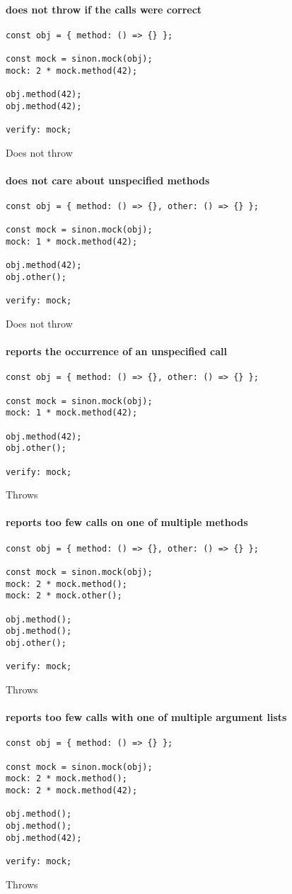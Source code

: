 \paragraph*{does not throw if the calls were correct}
\begin{verbatim}
const obj = { method: () => {} };

const mock = sinon.mock(obj);
mock: 2 * mock.method(42);

obj.method(42);
obj.method(42);

verify: mock;
\end{verbatim}
Does not throw
\paragraph*{does not care about unspecified methods}
\begin{verbatim}
const obj = { method: () => {}, other: () => {} };

const mock = sinon.mock(obj);
mock: 1 * mock.method(42);

obj.method(42);
obj.other();

verify: mock;
\end{verbatim}
Does not throw
\paragraph*{reports the occurrence of an unspecified call}
\begin{verbatim}
const obj = { method: () => {}, other: () => {} };

const mock = sinon.mock(obj);
mock: 1 * mock.method(42);

obj.method(42);
obj.other();

verify: mock;
\end{verbatim}
Throws
\paragraph*{reports too few calls on one of multiple methods}
\begin{verbatim}
const obj = { method: () => {}, other: () => {} };

const mock = sinon.mock(obj);
mock: 2 * mock.method();
mock: 2 * mock.other();

obj.method();
obj.method();
obj.other();

verify: mock;
\end{verbatim}
Throws
\paragraph*{reports too few calls with one of multiple argument lists}
\begin{verbatim}
const obj = { method: () => {} };

const mock = sinon.mock(obj);
mock: 2 * mock.method();
mock: 2 * mock.method(42);

obj.method();
obj.method();
obj.method(42);

verify: mock;
\end{verbatim}
Throws
